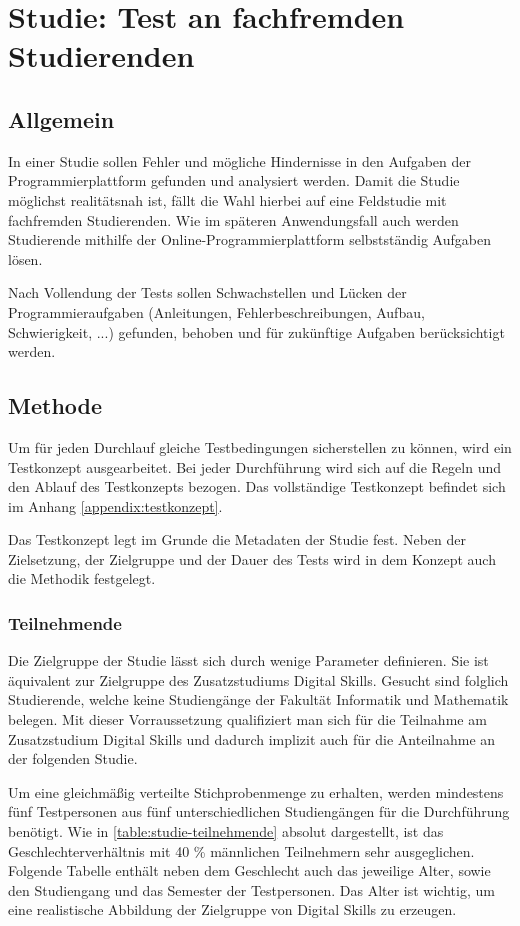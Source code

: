 \section{Studie: Test an fachfremden Studierenden}\label{studie}
\subsection{Allgemein}
In einer Studie sollen Fehler und mögliche Hindernisse in den Aufgaben der
Programmierplattform gefunden und analysiert werden. Damit die Studie möglichst
realitätsnah ist, fällt die Wahl hierbei auf eine Feldstudie mit fachfremden
Studierenden. Wie im späteren Anwendungsfall auch werden Studierende mithilfe
der Online-Programmierplattform selbstständig Aufgaben lösen.
\parencite{feldstudie}

Nach Vollendung der Tests sollen Schwachstellen und Lücken der
Programmieraufgaben (Anleitungen, Fehlerbeschreibungen, Aufbau, Schwierigkeit,
...) gefunden, behoben und für zukünftige Aufgaben berücksichtigt werden.

\subsection{Methode}
Um für jeden Durchlauf gleiche Testbedingungen sicherstellen zu können, wird ein
Testkonzept ausgearbeitet. Bei jeder Durchführung wird sich auf die Regeln
und den Ablauf des Testkonzepts bezogen. Das vollständige Testkonzept befindet
sich im Anhang \ref{appendix:testkonzept}.

Das Testkonzept legt im Grunde die Metadaten der Studie fest. Neben der
Zielsetzung, der Zielgruppe und der Dauer des Tests wird in dem Konzept auch die
Methodik festgelegt.

\subsubsection{Teilnehmende}
Die Zielgruppe der Studie lässt sich durch wenige Parameter definieren. Sie
ist äquivalent zur Zielgruppe des Zusatzstudiums Digital Skills. Gesucht sind
folglich Studierende, welche keine Studiengänge der Fakultät Informatik und
Mathematik belegen. Mit dieser Vorraussetzung qualifiziert man sich für die
Teilnahme am Zusatzstudium Digital Skills und dadurch implizit auch für die
Anteilnahme an der folgenden Studie.

Um eine gleichmäßig verteilte Stichprobenmenge zu erhalten, werden mindestens
fünf Testpersonen aus fünf unterschiedlichen Studiengängen für die Durchführung
benötigt. Wie in \autoref{table:studie-teilnehmende} absolut dargestellt, ist
das Geschlechterverhältnis mit 40 \% männlichen Teilnehmern sehr ausgeglichen.
Folgende Tabelle enthält neben dem Geschlecht auch das jeweilige Alter, sowie
den Studiengang und das Semester der Testpersonen. Das Alter ist wichtig, um
eine realistische Abbildung der Zielgruppe von Digital Skills zu erzeugen.

